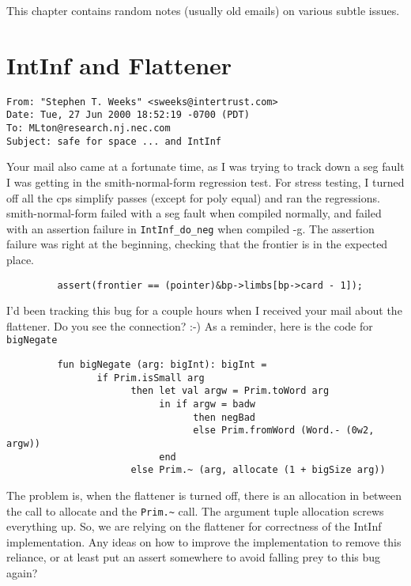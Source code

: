 

This chapter contains random notes (usually old emails) on various
subtle issues.

\section{IntInf and Flattener}

\begin{verbatim}
From: "Stephen T. Weeks" <sweeks@intertrust.com>
Date: Tue, 27 Jun 2000 18:52:19 -0700 (PDT)
To: MLton@research.nj.nec.com
Subject: safe for space ... and IntInf
\end{verbatim}

Your mail also came at a fortunate time, as I was trying to track down
a seg fault I was getting in the smith-normal-form regression test.
For stress testing, I turned off all the cps simplify passes (except
for poly equal) and ran the regressions.  smith-normal-form failed
with a seg fault when compiled normally, and failed with an assertion
failure in \verb+IntInf_do_neg+ when compiled -g.  The assertion
failure was right at the beginning, checking that the frontier is in
the expected place.
\begin{verbatim}
         assert(frontier == (pointer)&bp->limbs[bp->card - 1]);
\end{verbatim}
I'd been tracking this bug for a couple hours when I received your
mail about the flattener.  Do you see the connection? :-)  As a
reminder, here is the code for \verb+bigNegate+
\begin{verbatim}
         fun bigNegate (arg: bigInt): bigInt =
                if Prim.isSmall arg
                      then let val argw = Prim.toWord arg
                           in if argw = badw
                                 then negBad
                                 else Prim.fromWord (Word.- (0w2, argw))
                           end
                      else Prim.~ (arg, allocate (1 + bigSize arg))
\end{verbatim}
The problem is, when the flattener is turned off, there is an
allocation in between the call to allocate and the \verb+Prim.~+ call.  The
argument tuple allocation screws everything up.  So, we are relying on 
the flattener for correctness of the IntInf implementation.  Any ideas 
on how to improve the implementation to remove this reliance, or at
least put an assert somewhere to avoid falling prey to this bug again?

